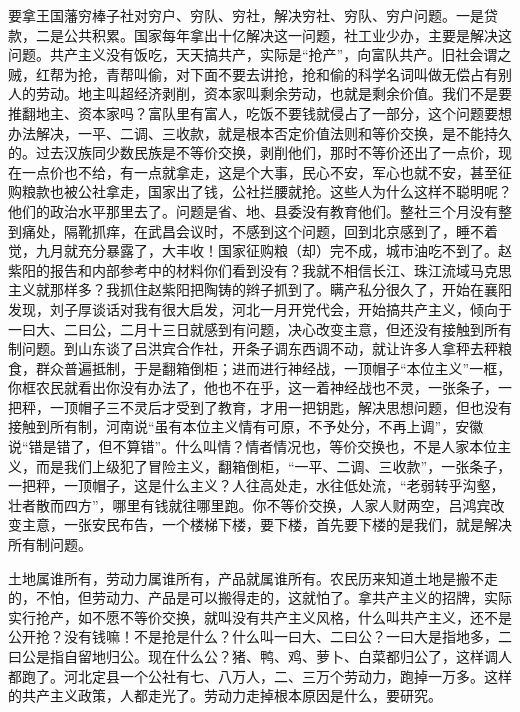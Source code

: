 要拿王国藩穷棒子社对穷户、穷队、穷社，解决穷社、穷队、穷户问题。一是贷款，二是公共积累。国家每年拿出十亿解决这一问题，社工业少办，主要是解决这问题。共产主义没有饭吃，天天搞共产，实际是“抢产”，向富队共产。旧社会谓之贼，红帮为抢，青帮叫偷，对下面不要去讲抢，抢和偷的科学名词叫做无偿占有别人的劳动。地主叫超经济剥削，资本家叫剩余劳动，也就是剩余价值。我们不是要推翻地主、资本家吗？富队里有富人，吃饭不要钱就侵占了一部分，这个问题要想办法解决，一平、二调、三收款，就是根本否定价值法则和等价交换，是不能持久的。过去汉族同少数民族是不等价交换，剥削他们，那时不等价还出了一点价，现在一点价也不给，有一点就拿走，这是个大事，民心不安，军心也就不安，甚至征购粮款也被公社拿走，国家出了钱，公社拦腰就抢。这些人为什么这样不聪明呢？他们的政治水平那里去了。问题是省、地、县委没有教育他们。整社三个月没有整到痛处，隔靴抓痒，在武昌会议时，不感到这个问题，回到北京感到了，睡不着觉，九月就充分暴露了，大丰收！国家征购粮（却）完不成，城市油吃不到了。赵紫阳的报告和内部参考中的材料你们看到没有？我就不相信长江、珠江流域马克思主义就那样多？我抓住赵紫阳把陶铸的辫子抓到了。瞒产私分很久了，开始在襄阳发现，刘子厚谈话对我有很大启发，河北一月开党代会，开始搞共产主义，倾向于一曰大、二曰公，二月十三日就感到有问题，决心改变主意，但还没有接触到所有制问题。到山东谈了吕洪宾合作社，开条子调东西调不动，就让许多人拿秤去秤粮食，群众普遍抵制，于是翻箱倒柜；进而进行神经战，一顶帽子“本位主义”一框，你框农民就看出你没有办法了，他也不在乎，这一着神经战也不灵，一张条子，一把秤，一顶帽子三不灵后才受到了教育，才用一把钥匙，解决思想问题，但也没有接触到所有制，河南说“虽有本位主义情有可原，不予处分，不再上调”，安徽说“错是错了，但不算错”。什么叫情？情者情况也，等价交换也，不是人家本位主义，而是我们上级犯了冒险主义，翻箱倒柜，“一平、二调、三收款”，一张条子，一把秤，一顶帽子，这是什么主义？人往高处走，水往低处流，“老弱转乎沟壑，壮者散而四方”，哪里有钱就往哪里跑。你不等价交换，人家人财两空，吕鸿宾改变主意，一张安民布告，一个楼梯下楼，要下楼，首先要下楼的是我们，就是解决所有制问题。

土地属谁所有，劳动力属谁所有，产品就属谁所有。农民历来知道土地是搬不走的，不怕，但劳动力、产品是可以搬得走的，这就怕了。拿共产主义的招牌，实际实行抢产，如不愿不等价交换，就叫没有共产主义风格，什么叫共产主义，还不是公开抢？没有钱嘛！不是抢是什么？什么叫一曰大、二曰公？一曰大是指地多，二曰公是指自留地归公。现在什么公？猪、鸭、鸡、萝卜、白菜都归公了，这样调人都跑了。河北定县一个公社有七、八万人，二、三万个劳动力，跑掉一万多。这样的共产主义政策，人都走光了。劳动力走掉根本原因是什么，要研究。

